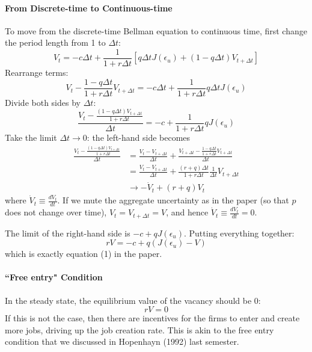 \documentclass[12pt]{article}
\begin{document}
\paragraph{From Discrete-time to Continuous-time \\ [6pt]}

To move from the discrete-time Bellman equation to continuous time, first change the period length from 1 to $\Delta t$:
\[	V_t = - c \Delta t + \frac{1}{1+r\Delta t} \left[q \Delta t J(\epsilon_u) + (1-q \Delta t) V_{t+\Delta t} \right]\]
Rearrange terms:
\[V_t - \frac{1-q\Delta t}{1+r\Delta t} V_{t+ \Delta t} = - c\Delta t + \frac{1}{1+r\Delta t} q\Delta t J(\epsilon_u)\]
Divide both sides by $\Delta t$:
\[\frac{V_t - \frac{(1-q\Delta t) V_{t+ \Delta t}}{1 + r \Delta t}}{\Delta t} = - c + \frac{1}{1+r\Delta t} q J(\epsilon_u)\]
Take the limit $\Delta t \to 0$: the left-hand side becomes
\begin{align}
	\frac{V_t - \frac{(1-q\Delta t) V_{t+ \Delta t}}{1 + r \Delta t}}{\Delta t} & = \frac{V_t - V_{t+ \Delta t}}{\Delta t} + \frac{V_{t + \Delta t} - \frac{1-q\Delta t}{1+r\Delta t} V_{t+\Delta t}}{\Delta t} \nonumber \\
	& = \frac{V_t - V_{t+ \Delta t}}{\Delta t} + \frac{(r+q)\Delta t}{1+r \Delta t}\frac{1}{\Delta t} V_{t+ \Delta t} \nonumber \\
	& \to -\dot{V}_t + (r+q)V_t
\end{align}
where $\dot{V}_t \equiv \frac{d V_t}{dt}$. If we mute the aggregate uncertainty as in the paper (so that $p$ does not change over time), $V_t = V_{t+\Delta t} = V$, and hence $\dot{V}_t \equiv \frac{d V_t}{dt} = 0$.
 
The limit of the right-hand side is $- c + q J(\epsilon_u)$. Putting everything together:
\begin{equation} \label{eq:bellman_vacancy}
	r V = - c + q (J(\epsilon_u) - V)
\end{equation} 
which is exactly equation (1) in the paper. 

\paragraph{``Free entry" Condition \\ [6pt]}
In the steady state, the equilibrium value of the vacancy should be 0:
\begin{equation} \label{eq:free_entry}
	rV = 0
\end{equation}
If this is not the case, then there are incentives for the firms to enter and create more jobs, driving up the job creation rate. This is akin to the free entry condition that we discussed in Hopenhayn (1992) last semester.
\end{document}
